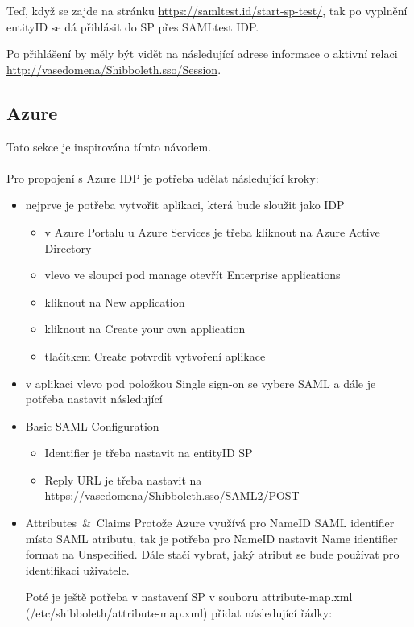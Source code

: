 Teď, když se zajde na stránku \url{https://samltest.id/start-sp-test/}, tak po vyplnění entityID se dá přihlásit do SP přes SAMLtest IDP.

Po přihlášení by měly být vidět na následující adrese informace o aktivní relaci \url{http://vasedomena/Shibboleth.sso/Session}.

\subsection{Azure}

Tato sekce je inspirována tímto návodem.\cite{AzureTutorial}
\\
\\
Pro propojení s Azure IDP je potřeba udělat následující kroky:
\begin{itemize}
    \item nejprve je potřeba vytvořit aplikaci, která bude sloužit jako IDP
    \begin{itemize}
    \item v Azure Portalu u Azure Services je třeba kliknout na Azure Active Directory
    \item vlevo ve sloupci pod manage otevřít Enterprise applications
    \item kliknout na New application
    \item kliknout na Create your own application
    \item tlačítkem Create potvrdit vytvoření aplikace
    \end{itemize}
    \item v aplikaci vlevo pod položkou Single sign-on se vybere SAML a dále je potřeba nastavit následující
    \item Basic SAML Configuration
    \begin{itemize}
        \item Identifier je třeba nastavit na entityID SP
        \item Reply URL je třeba nastavit na \url{https://vasedomena/Shibboleth.sso/SAML2/POST}
    \end{itemize}
    \item \mbox{Attributes \& Claims} \linebreak
    Protože Azure využívá pro NameID SAML identifier místo SAML atributu, tak je potřeba pro NameID nastavit Name identifier format na Unspecified.
    Dále stačí vybrat, jaký atribut se bude používat pro identifikaci uživatele.
    
    Poté je ještě potřeba v nastavení SP v souboru attribute-map.xml (/etc/shibboleth/attribute-map.xml) přidat následující řádky:
    

\end{itemize}
